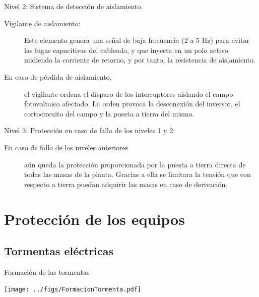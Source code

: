\documentclass[aspectratio=169, usenames,svgnames,dvipsnames]{beamer}
\begin{document}
\begin{frame}[label={sec:orga4e8f57}]{Nivel 2: Sistema de detección de aislamiento.}
\begin{description}
\item[{Vigilante de aislamiento:}] Este elemento genera una señal de baja
frecuencia (2 a 5 Hz) para evitar las fugas capacitivas del cableado,
y que inyecta en un polo activo midiendo la corriente de retorno, y
por tanto, la resistencia de aislamiento.

\item[{En caso de pérdida de aislamiento,}] el vigilante ordena el disparo
de los interruptores aislando el campo fotovoltaico afectado. La
orden provoca la desconexión del inversor, el cortocircuito del campo
y la puesta a tierra del mismo.
\end{description}
\end{frame}

\begin{frame}[label={sec:org6c44419}]{Nivel 3: Protección en caso de fallo de los niveles 1 y 2:}
\begin{description}
\item[{En caso de fallo de los niveles anteriores}] aún queda la protección
proporcionada por la puesta a tierra directa de todas las masas de la
planta. Gracias a ella se limitara la tensión que con respecto a
tierra puedan adquirir las masas en caso de derivación.
\end{description}
\end{frame}



\section{Protección de los equipos}
\label{sec:orgdf39fe5}

\subsection{Tormentas eléctricas}
\label{sec:org2357068}

\begin{frame}[label={sec:orgcd14ef2}]{Formación de las tormentas}
\begin{center}
\texttt{[image: ../figs/FormacionTormenta.pdf]}
\end{center}
\end{frame}
\end{document}
